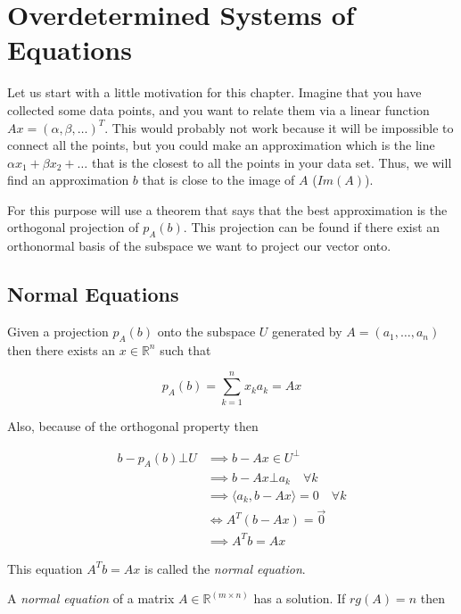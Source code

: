 \newpage
\section{Overdetermined Systems of Equations}

Let us start with a little motivation for this chapter. Imagine that you have collected some data points, 
and you want to relate them via a linear function \(Ax = (\alpha, \beta, \dots)^T\). This would probably not work because 
it will be impossible to connect all the points, but you could make an approximation 
which is the line \(\alpha x_1 + \beta x_2 + \dots\) that is the closest to all the points in your data set. Thus, we will find an approximation 
\(b\) that is close to the image of \(A\) (\(Im(A)\)).
\vspace{\baselineskip}

For this purpose will use a theorem that says that the best approximation is the orthogonal projection of 
\(p_A (b)\). This projection can be found if there exist an orthonormal basis of the subspace we want to project 
our vector onto.

\subsection{Normal Equations}

Given a projection \(p_A (b)\) onto the subspace \(U\) generated by \(A = (a_1, \dots, a_n)\) then there exists an 
\(x \in \mathbb{R}^n\) such that 

\[
p_{A}(b) = \sum_{k = 1}^{n} x_k a_k = Ax
\]

Also, because of the orthogonal property then

\begin{align*}
b - p_{A}(b) \bot U &\implies b - Ax  \in U^{\bot}\\
					&\implies b - Ax \bot a_k \quad \forall k\\
					&\implies \langle a_k, b - Ax \rangle = 0 \quad \forall k\\
					&\iff A^{T} (b - Ax) = \vec{0}\\
					&\implies A^{T}b = Ax 
\end{align*}

This equation \(A^{T}b = Ax\) is called the \emph{normal equation}.
\vspace{\baselineskip}

A \emph{normal equation} of a matrix \(A \in \mathbb{R}^{(m \times n)}\) has a solution. 
If \(rg(A) = n\) then 

